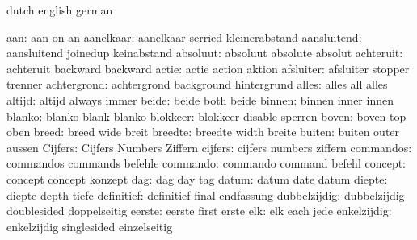 


\startvariables       dutch                english             german

                aan:  aan                  on                  an
          aanelkaar:  aanelkaar            serried             kleinerabstand
        aansluitend:  aansluitend          joinedup            keinabstand
           absoluut:  absoluut             absolute            absolut
          achteruit:  achteruit            backward            backward %
              actie:  actie                action              aktion %
          afsluiter:  afsluiter            stopper             trenner
        achtergrond:  achtergrond          background          hintergrund
              alles:  alles                all                 alles
             altijd:  altijd               always              immer
              beide:  beide                both                beide
             binnen:  binnen               inner               innen
             blanko:  blanko               blank               blanko
           blokkeer:  blokkeer             disable             sperren
              boven:  boven                top                 oben
              breed:  breed                wide                breit
            breedte:  breedte              width               breite
             buiten:  buiten               outer               aussen
            Cijfers:  Cijfers              Numbers             Ziffern
            cijfers:  cijfers              numbers             ziffern
          commandos:  commandos            commands            befehle
           commando:  commando             command             befehl
            concept:  concept              concept             konzept
                dag:  dag                  day                 tag
              datum:  datum                date                datum
             diepte:  diepte               depth               tiefe
         definitief:  definitief           final               endfassung
       dubbelzijdig:  dubbelzijdig         doublesided         doppelseitig
             eerste:  eerste               first               erste
                elk:  elk                  each                jede
        enkelzijdig:  enkelzijdig          singlesided         einzelseitig
